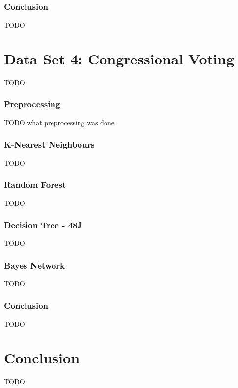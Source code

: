 \documentclass{sig-alternate-05-2015}
\begin{document}
\subsubsection{Conclusion}
TODO\\


\section{Data Set 4: Congressional Voting}
TODO\\
\subsubsection{Preprocessing}
TODO what preprocessing was done\\
\subsubsection{K-Nearest Neighbours}
TODO\\
\subsubsection{Random Forest}
TODO\\
\subsubsection{Decision Tree - 48J}
TODO\\
\subsubsection{Bayes Network}
TODO\\
\subsubsection{Conclusion}
TODO\\


\section{Conclusion}
TODO\\
\end{document}
